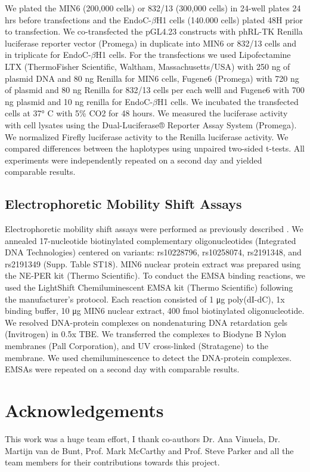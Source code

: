We plated the MIN6 (200,000 cells) or 832/13 (300,000 cells) in 24-well plates 24 hrs before transfections and the EndoC-$\beta$H1 cells (140.000 cells) plated 48H prior to transfection. We co-transfected the pGL4.23 constructs with phRL-TK Renilla luciferase reporter vector (Promega) in duplicate into MIN6 or 832/13 cells and in triplicate for EndoC-$\beta$H1 cells. For the transfections we used Lipofectamine LTX (ThermoFisher Scientific, Waltham, Massachusetts/USA) with 250 ng of plasmid DNA and 80 ng Renilla for MIN6 cells, Fugene6 (Promega) with 720 ng of plasmid and 80 ng Renilla for 832/13 cells per each welll and Fugene6 with 700 ng plasmid and 10 ng renilla for EndoC-$\beta$H1 cells. We incubated the transfected cells at 37° C with 5\% CO2 for 48 hours. We measured the luciferase activity with cell lysates using the Dual-Luciferase® Reporter Assay System (Promega). We normalized Firefly luciferase activity to the Renilla luciferase activity. We compared differences between the haplotypes using unpaired two-sided t-tests. All experiments were independently repeated on a second day and yielded comparable results.

\subsection{Electrophoretic Mobility Shift Assays}
Electrophoretic mobility shift assays were performed as previously described \cite{fogartyIdentificationRegulatoryVariant2014}. We annealed 17-nucleotide biotinylated complementary oligonucleotides (Integrated DNA Technologies) centered on variants: rs10228796, rs10258074, rs2191348, and rs2191349 (Supp. Table ST18). MIN6 nuclear protein extract was prepared using the NE-PER kit (Thermo Scientific). To conduct the EMSA binding reactions, we used the LightShift Chemiluminescent EMSA kit (Thermo Scientific) following the manufacturer's protocol. Each reaction consisted of 1 μg poly(dI-dC), 1x binding buffer, 10 μg MIN6 nuclear extract, 400 fmol biotinylated oligonucleotide. We resolved DNA-protein complexes on nondenaturing DNA retardation gels (Invitrogen) in 0.5x TBE. We transferred the complexes to Biodyne B Nylon membranes (Pall Corporation), and UV cross-linked (Stratagene) to the membrane. We used chemiluminescence to detect the DNA-protein complexes. EMSAs were repeated on a second day with comparable results.

\section{Acknowledgements}
This work was a huge team effort, I thank co-authors Dr. Ana Vinuela, Dr. Martijn van de Bunt, Prof. Mark McCarthy and Prof. Steve Parker and all the team members for their contributions towards this project. 
